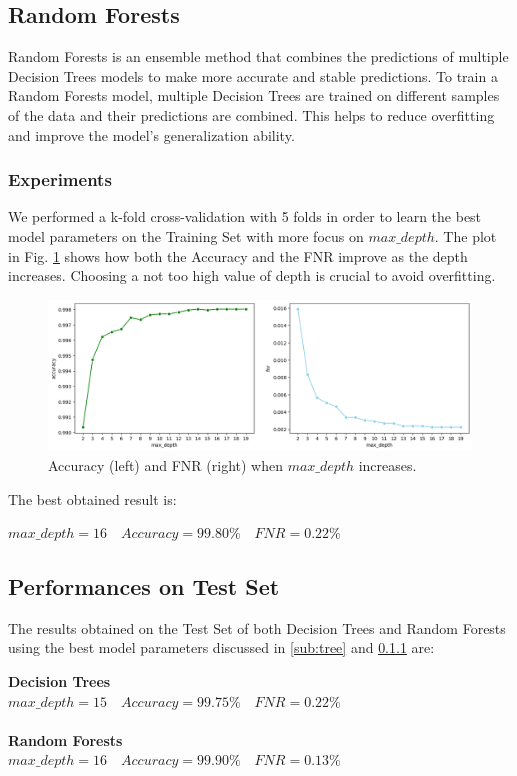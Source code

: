 \documentclass[twocolumn, switch]{article} %
\newcommand\x{0.7}
\begin{document}
\subsection{Random Forests}
Random Forests is an ensemble method that combines the predictions of multiple Decision Trees models to make more accurate and stable predictions.
To train a Random Forests model, multiple Decision Trees are trained on different samples of the data and their predictions are combined. This helps to reduce overfitting and improve the model's generalization ability.

\subsubsection{Experiments}
\label{sub:randomforest}
We performed a k-fold cross-validation with 5 folds in order to learn the best model parameters on the Training Set with more focus on $max\_depth$. The plot in Fig. \ref{fig:foresttrain} shows how both the Accuracy and the FNR improve as the depth increases. Choosing a not too high value of depth is crucial to avoid overfitting.

\begin{figure}[ht!]
	\centering
	\includegraphics[width=\x\linewidth]{randomforest_accuracy_fnr.png}
	\caption{Accuracy (left) and FNR (right) when $max\_depth$ increases.}
	\label{fig:foresttrain}
\end{figure}
The best obtained result is:
\begin{center}
	$max\_depth=16 \quad Accuracy=99.80\% \quad FNR=0.22\%$
\end{center}

\subsection{Performances on Test Set}
The results obtained on the Test Set of both Decision Trees and Random Forests using the best model parameters discussed in \ref{sub:tree} and \ref{sub:randomforest} are:
\begin{center}
	\textbf{Decision Trees}\\
	$max\_depth=15 \quad Accuracy=99.75\% \quad FNR=0.22\%$\\~\\
	\textbf{Random Forests}\\
	$max\_depth=16 \quad Accuracy=99.90\% \quad FNR=0.13\%$
\end{center}
\end{document}
